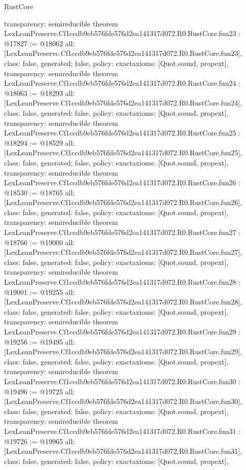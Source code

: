 \begin{lexlean}{RustCore}
\begin{coremodule}
{  transparency: semireducible
}
theorem LexLeanPreserve.Cf1ccdb9eb576fde576d2ea141317d072.R0.RustCore.fun23 : @17827 := @18062 {
  all: [LexLeanPreserve.Cf1ccdb9eb576fde576d2ea141317d072.R0.RustCore.fun23],
  class: false,
  generated: false,
  policy: exact{axioms: [Quot.sound, propext]},
  transparency: semireducible
}
theorem LexLeanPreserve.Cf1ccdb9eb576fde576d2ea141317d072.R0.RustCore.fun24 : @18063 := @18293 {
  all: [LexLeanPreserve.Cf1ccdb9eb576fde576d2ea141317d072.R0.RustCore.fun24],
  class: false,
  generated: false,
  policy: exact{axioms: [Quot.sound, propext]},
  transparency: semireducible
}
theorem LexLeanPreserve.Cf1ccdb9eb576fde576d2ea141317d072.R0.RustCore.fun25 : @18294 := @18529 {
  all: [LexLeanPreserve.Cf1ccdb9eb576fde576d2ea141317d072.R0.RustCore.fun25],
  class: false,
  generated: false,
  policy: exact{axioms: [Quot.sound, propext]},
  transparency: semireducible
}
theorem LexLeanPreserve.Cf1ccdb9eb576fde576d2ea141317d072.R0.RustCore.fun26 : @18530 := @18765 {
  all: [LexLeanPreserve.Cf1ccdb9eb576fde576d2ea141317d072.R0.RustCore.fun26],
  class: false,
  generated: false,
  policy: exact{axioms: [Quot.sound, propext]},
  transparency: semireducible
}
theorem LexLeanPreserve.Cf1ccdb9eb576fde576d2ea141317d072.R0.RustCore.fun27 : @18766 := @19000 {
  all: [LexLeanPreserve.Cf1ccdb9eb576fde576d2ea141317d072.R0.RustCore.fun27],
  class: false,
  generated: false,
  policy: exact{axioms: [Quot.sound, propext]},
  transparency: semireducible
}
theorem LexLeanPreserve.Cf1ccdb9eb576fde576d2ea141317d072.R0.RustCore.fun28 : @19001 := @19255 {
  all: [LexLeanPreserve.Cf1ccdb9eb576fde576d2ea141317d072.R0.RustCore.fun28],
  class: false,
  generated: false,
  policy: exact{axioms: [Quot.sound, propext]},
  transparency: semireducible
}
theorem LexLeanPreserve.Cf1ccdb9eb576fde576d2ea141317d072.R0.RustCore.fun29 : @19256 := @19495 {
  all: [LexLeanPreserve.Cf1ccdb9eb576fde576d2ea141317d072.R0.RustCore.fun29],
  class: false,
  generated: false,
  policy: exact{axioms: [Quot.sound, propext]},
  transparency: semireducible
}
theorem LexLeanPreserve.Cf1ccdb9eb576fde576d2ea141317d072.R0.RustCore.fun30 : @19496 := @19725 {
  all: [LexLeanPreserve.Cf1ccdb9eb576fde576d2ea141317d072.R0.RustCore.fun30],
  class: false,
  generated: false,
  policy: exact{axioms: [Quot.sound, propext]},
  transparency: semireducible
}
theorem LexLeanPreserve.Cf1ccdb9eb576fde576d2ea141317d072.R0.RustCore.fun31 : @19726 := @19965 {
  all: [LexLeanPreserve.Cf1ccdb9eb576fde576d2ea141317d072.R0.RustCore.fun31],
  class: false,
  generated: false,
  policy: exact{axioms: [Quot.sound, propext]},
}
\end{coremodule}
\end{lexlean}
